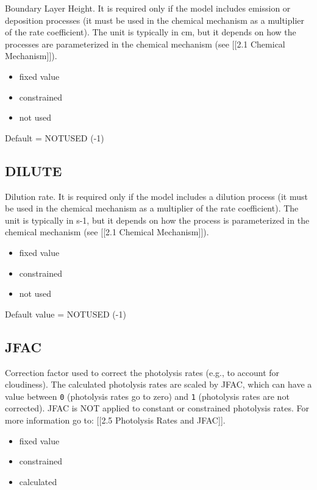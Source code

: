 Boundary Layer Height. It is required only if the model includes
emission or deposition processes (it must be used in the chemical
mechanism as a multiplier of the rate coefficient). The unit is
typically in cm, but it depends on how the processes are parameterized
in the chemical mechanism (see {[}{[}2.1 Chemical Mechanism{]}{]}).

\begin{itemize}
\tightlist
\item
  fixed value
\item
  constrained
\item
  not used
\end{itemize}

Default = NOTUSED (-1)

\hypertarget{dilute}{%
\subsection{DILUTE}\label{dilute}}

Dilution rate. It is required only if the model includes a dilution
process (it must be used in the chemical mechanism as a multiplier of
the rate coefficient). The unit is typically in s-1, but it depends on
how the process is parameterized in the chemical mechanism (see
{[}{[}2.1 Chemical Mechanism{]}{]}).

\begin{itemize}
\tightlist
\item
  fixed value
\item
  constrained
\item
  not used
\end{itemize}

Default value = NOTUSED (-1)

\hypertarget{jfac}{%
\subsection{JFAC}\label{jfac}}

Correction factor used to correct the photolysis rates (e.g., to account
for cloudiness). The calculated photolysis rates are scaled by JFAC,
which can have a value between \texttt{0} (photolysis rates go to zero)
and \texttt{1} (photolysis rates are not corrected). JFAC is NOT applied
to constant or constrained photolysis rates. For more information go to:
{[}{[}2.5 Photolysis Rates and JFAC{]}{]}.

\begin{itemize}
\tightlist
\item
  fixed value
\item
  constrained
\item
  calculated
\end{itemize}

